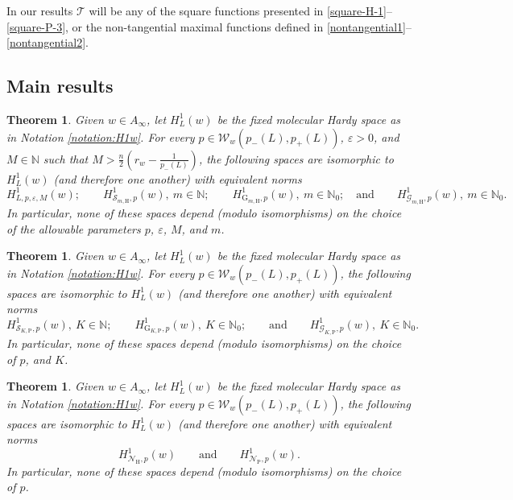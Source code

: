 \documentclass[11pt, a4paper,leqno]{amsart}
\theoremstyle{plain}
\newtheorem{theorem}[equation]{Theorem}
\theoremstyle{definition}
\theoremstyle{remark}
\numberwithin{equation}{section}
\def \N{ \mathbb{N} }
\def \Scal{ \mathcal{S} }
\def \hh{ \mathrm{H} }
\def \pp{ \mathrm{P} }
\def \Gcal { \mathcal{G} }
\def \Grm{ \mathrm{G} }
\def \Ncal { \mathcal{N} }
\begin{document}
In our results $\mathcal{T}$ will be any of the square functions
presented in \eqref{square-H-1}--\eqref{square-P-3}, or the non-tangential maximal functions defined in \eqref{nontangential1}--\eqref{nontangential2}.






\subsection{Main results}\label{section:DR}















\begin{theorem}\label{thm:hardychartz}
Given $w\in A_{\infty}$, let $H^1_L(w)$ be the fixed molecular Hardy space as in Notation \ref{notation:H1w}. For every $p\in\mathcal{W}_w(p_-(L),p_+(L))$, $\varepsilon>0$, and $ M\in \N$ such that $M>\frac{n}{2}\left(r_w-\frac{1}{p_-(L)}\right)$, the following spaces are isomorphic to $H^1_L(w)$ (and therefore one another) with equivalent norms
$$
H^1_{L,p,\varepsilon,M}(w);
\qquad
H^1_{\Scal_{m,\hh},p}(w),\ m\in \N;
\qquad
H^1_{\Grm_{m,\hh},p}(w),\ m\in \N_0;
\quad \textrm{and}
\qquad
H^1_{\Gcal_{m,\hh},p}(w),\ m\in \N_0.
$$
In particular, none of these spaces depend (modulo isomorphisms) on the choice of the allowable parameters $p$, $\varepsilon$, $M$, and $m$. 
\end{theorem}

\begin{theorem}\label{thm:hardychartzPoisson}
Given $w\in A_{\infty}$, let $H^1_L(w)$ be the fixed molecular Hardy space as in Notation \ref{notation:H1w}. For every $p\in\mathcal{W}_w(p_-(L),p_+(L))$, the following spaces are isomorphic to $H^1_L(w)$ (and therefore one another) with equivalent norms
$$
H^1_{\Scal_{K,\pp},p}(w),\ K\in \N;
\qquad
H^1_{\Grm_{K,\pp},p}(w),\ K\in \N_0;
\qquad\textrm{and}\qquad
H^1_{\Gcal_{K,\pp},p}(w),\ K\in \N_0.
$$
In particular, none of these spaces depend (modulo isomorphisms) on the choice of $p$, and $K$.
\end{theorem}

\begin{theorem}\label{thm:hardychartzNontangential}
Given $w\in A_{\infty}$, let $H^1_L(w)$ be the fixed molecular Hardy space as in Notation \ref{notation:H1w}. For every $p\in\mathcal{W}_w(p_-(L),p_+(L))$, the following spaces are isomorphic to $H^1_L(w)$ (and therefore one another) with equivalent norms
$$
H^1_{\Ncal_{\hh},p}(w)
\qquad\textrm{and}\qquad
H^1_{\Ncal_{\pp},p}(w).
$$
In particular, none of these spaces depend (modulo isomorphisms) on the choice of $p$.
\end{theorem}
\end{document}
